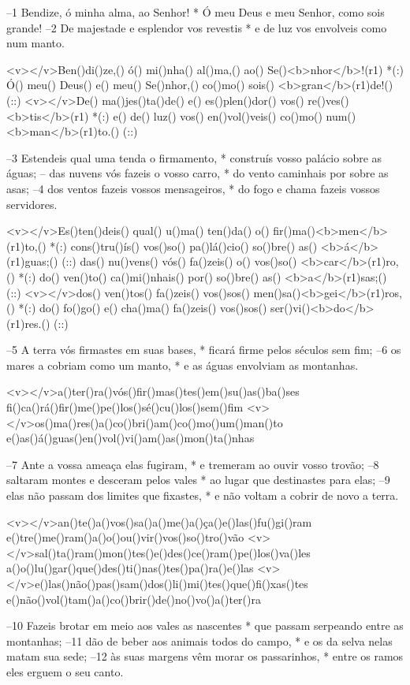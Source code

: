 –1 Bendize, ó minha alma, ao Senhor! *
Ó meu Deus e meu Senhor, como sois grande!
–2 De majestade e esplendor vos revestis *
e de luz vos envolveis como num manto.

<v></v>Ben()di()ze,() ó() mi()nha() al()ma,() ao() Se()<b>nhor</b>!(r1) *(:)
Ó() meu() Deus() e() meu() Se()nhor,() co()mo() sois() <b>gran</b>(r1)de!() (::)
<v></v>De() ma()jes()ta()de() e() es()plen()dor() vos() re()ves()<b>tis</b>(r1) *(:)
e() de() luz() vos() en()vol()veis() co()mo() num() <b>man</b>(r1)to.() (::)

–3 Estendeis qual uma tenda o firmamento, *
construís vosso palácio sobre as águas;
– das nuvens vós fazeis o vosso carro, *
do vento caminhais por sobre as asas;
–4 dos ventos fazeis vossos mensageiros, *
do fogo e chama fazeis vossos servidores.

<v></v>Es()ten()deis() qual() u()ma() ten()da() o() fir()ma()<b>men</b>(r1)to,() *(:)
cons()tru()ís() vos()so() pa()lá()cio() so()bre() as() <b>á</b>(r1)guas;() (::)
das() nu()vens() vós() fa()zeis() o() vos()so() <b>car</b>(r1)ro,() *(:)
do() ven()to() ca()mi()nhais() por() so()bre() as() <b>a</b>(r1)sas;() (::)
<v></v>dos() ven()tos() fa()zeis() vos()sos() men()sa()<b>gei</b>(r1)ros,() *(:)
do() fo()go() e() cha()ma() fa()zeis() vos()sos() ser()vi()<b>do</b>(r1)res.() (::)

–5 A terra vós firmastes em suas bases, *
ficará firme pelos séculos sem fim;
–6 os mares a cobriam como um manto, *
e as águas envolviam as montanhas.

<v></v>a()ter()ra()vós()fir()mas()tes()em()su()as()ba()ses
fi()ca()rá()fir()me()pe()los()sé()cu()los()sem()fim
<v></v>os()ma()res()a()co()bri()am()co()mo()um()man()to
e()as()á()guas()en()vol()vi()am()as()mon()ta()nhas

–7 Ante a vossa ameaça elas fugiram, *
e tremeram ao ouvir vosso trovão;
–8 saltaram montes e desceram pelos vales *
ao lugar que destinastes para elas;
–9 elas não passam dos limites que fixastes, *
e não voltam a cobrir de novo a terra.

<v></v>an()te()a()vos()sa()a()me()a()ça()e()las()fu()gi()ram
e()tre()me()ram()a()o()ou()vir()vos()so()tro()vão
<v></v>sal()ta()ram()mon()tes()e()des()ce()ram()pe()los()va()les
a()o()lu()gar()que()des()ti()nas()tes()pa()ra()e()las
<v></v>e()las()não()pas()sam()dos()li()mi()tes()que()fi()xas()tes
e()não()vol()tam()a()co()brir()de()no()vo()a()ter()ra

–10 Fazeis brotar em meio aos vales as nascentes *
que passam serpeando entre as montanhas;
–11 dão de beber aos animais todos do campo, *
e os da selva nelas matam sua sede;
–12 às suas margens vêm morar os passarinhos, *
entre os ramos eles erguem o seu canto.

